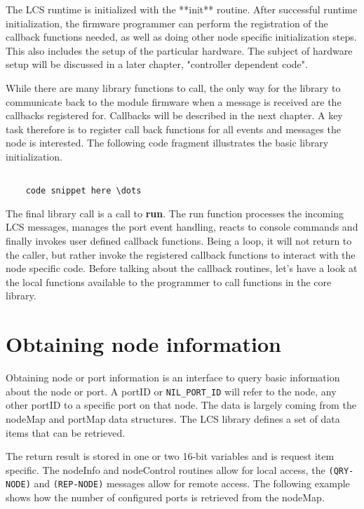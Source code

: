 The LCS runtime is initialized with the **init** routine. After successful runtime initialization, the firmware programmer can perform the registration of the callback functions needed, as well as doing other node specific initialization steps. This also includes the setup of the particular hardware. The subject of hardware setup will be discussed in a later chapter, "controller dependent code". 

While there are many library functions to call, the only way for the library to communicate back to the module firmware when a message is received are the callbacks registered for. Callbacks will be described in the next chapter. A key task therefore is to register call back functions for all events and messages the node is interested. The following code fragment illustrates the basic library initialization.

\lstset{language=c++, style=codesnippetstyle}
\begin{lstlisting}
   
    code snippet here \dots

\end{lstlisting}


The final library call is a call to \textbf{run}. The run function processes the incoming LCS messages, manages the port event handling, reacts to console commands and finally invokes user defined callback functions. Being a loop, it will not return to the caller, but rather invoke the registered callback functions to interact with the node specific code. Before talking about the callback routines, let's have a look at the local functions available to the  programmer to call functions in the core library.

\section{Obtaining node information}

Obtaining node or port information is an interface to query basic information about the node or port. A portID or \texttt{NIL\_PORT\_ID} will refer to the node, any other portID to a specific port on that node. The data is largely coming from the nodeMap and portMap data structures. The LCS library defines a set of data items that can be retrieved. 

The return result is stored in one or two 16-bit variables and is request item specific. The nodeInfo and nodeControl routines allow for local access, the \texttt{(QRY-NODE)} and \texttt{(REP-NODE)} messages allow for remote access. The following example shows how the number of configured ports is retrieved from the nodeMap.



